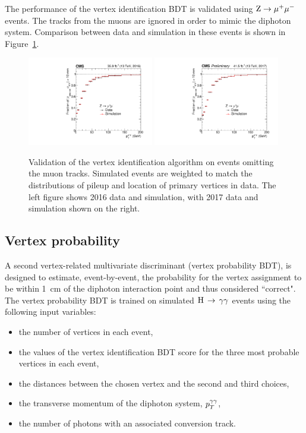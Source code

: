 The performance of the vertex identification BDT is
validated using $\mathrm{Z}\rightarrow{\mu^{+}\mu^{-}}$ events.
The tracks from the muons are ignored in order to mimic the diphoton system.
Comparison between data and simulation in these events is shown in Figure~\ref{fig:obj_VtxId}.

\begin{figure}[h!]
  \centering
  \includegraphics[width=0.49\textwidth]{Figures/Objects/VtxId2016}
  \includegraphics[width=0.49\textwidth]{Figures/Objects/VtxId2017}
  \caption[Vertex identification validation in \Zmumu events.]
  {
    Validation of the \Hgg vertex identification algorithm on \Zmumu events
    omitting the muon tracks. 
    Simulated events are weighted to match the distributions of pileup
    and location of primary vertices in data.
    The left figure shows 2016 data and simulation, with 2017 data and simulation shown on the right.
  }
  \label{fig:obj_VtxId}
\end{figure}

\subsection{Vertex probability}

A second vertex-related multivariate discriminant (vertex probability BDT),
is designed to estimate, event-by-event, the probability for the vertex
assignment to be within \SI{1}{cm} of the diphoton interaction point
and thus considered ``correct".
The vertex probability BDT is trained on simulated $\mathrm{H}\,\rightarrow\,\gamma\gamma$ events using
the following input variables:
\begin{itemize}
        \item the number of vertices in each event,
        \item the values of the vertex identification BDT score for
                the three most probable vertices in each event,
        \item the distances between the chosen vertex and the second and
                third choices,
        \item the transverse momentum of the diphoton system, $p_T^{\gamma\gamma}$,
        \item the number of photons with an associated conversion track.
\end{itemize}

